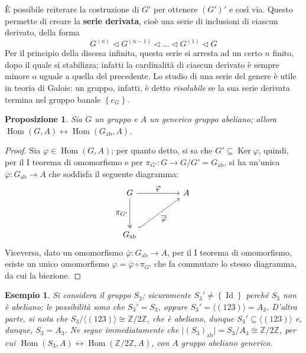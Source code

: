 \documentclass[12pt]{scrartcl}
\theoremstyle{style}
\newtheorem{esempio}{Esempio}[section]
\newtheorem{prop}{Proposizione}[section]
\numberwithin{equation}{subsection}
\begin{document}
\noindent \`E possibile reiterare la costruzione di $G'$ per ottenere $(G')'$ e cos\`i via. 
Questo permette di creare la \textbf{serie derivata}, cio\`e una serie di inclusioni di ciascun derivato, della forma
\begin{equation}
	G^{(n)} \lhd G^{(n-1)} \lhd \ldots\lhd G^{(1)} \lhd G
\end{equation}
Per il principio della discesa infinita, questa serie si arresta ad un certo $n$ finito, dopo il quale si stabilizza; infatti la cardinalit\`a di ciascun derivato \`e sempre minore o uguale a quella del precedente.
Lo studio di una serie del genere \`e utile in teoria di Galois: un gruppo, infatti, \`e detto \textit{risolubile} se la sua serie derivata termina nel gruppo banale $\left\{ e_G \right\} $.

\begin{prop}
	Sia $G$ un gruppo e $A$ un generico gruppo abeliano; allora $\operatorname{Hom} (G,A) \longleftrightarrow \operatorname{Hom} (G_\text{ab},A)$.
\end{prop}
	\begin{proof}
		Sia $\varphi \in \operatorname{Hom} (G,A)$; per quanto detto, si sa che $G' \subseteq \operatorname{Ker} \varphi $, quindi, per il I teorema di omomorfismo e per $\pi_{G'}:G\to G / G' = G_\text{ab} $, si ha un'unica $\overline{\varphi }:G_\text{ab}\to A$ che soddisfa il seguente diagramma:
		\[
		\begin{tikzcd}
			G & & A \\
			\\
G_\text{ab}
\arrow[from=1-1, to=1-3,"\displaystyle \varphi"]
\arrow[from=1-1, to=3-1,"\displaystyle \pi_{G'} "',two heads]
\arrow[from=3-1, to=1-3, "\displaystyle \overline{\varphi }"',hook]
		\end{tikzcd}
		\] 
		Viceversa, dato un omomorfismo $\overline{\varphi }:G_\text{ab}\to A$, per il I teorema di omomorfismo, esiste un unico omomorfismo $\varphi = \overline{\varphi }\circ \pi_{G'} $ che fa commutare lo stesso diagramma, da cui la biezione.
	\end{proof}
\begin{esempio}
Si considera il gruppo $S_3$; sicuramente $S_3'\neq \left\{ \operatorname{Id}  \right\} $ perch\'e $S_3$ non \`e abeliano; le possibilit\`a sono che $S_3' = S_3$, oppure $S_3' = \langle (123) \rangle = A_3$.
D'altra parte, si nota che $S_3 / \langle (123) \rangle \cong \mathbb{Z}/2\mathbb{Z}$, che \`e abeliano, dunque $S_3' \subseteq \langle (123) \rangle$ e, dunque, $S_3 = A_3$.
Ne segue immediatamente che $\lvert (S_3)_\text{ab} \rvert = S_3 / A_3 \cong \mathbb{Z}/2\mathbb{Z}$, per cui $\operatorname{Hom} (S_3 , A) \longleftrightarrow \operatorname{Hom} (\mathbb{Z}/2\mathbb{Z},A)$, con $A$ gruppo abeliano generico.
\end{esempio}
\end{document}
